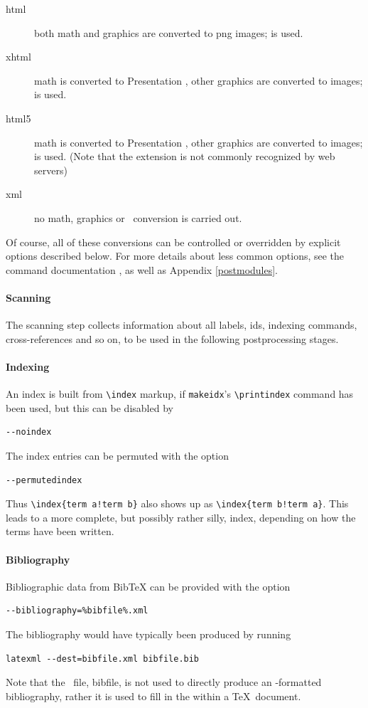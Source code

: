 \documentclass{book}
\newcommand{\shellcode}{\lstinline[style=shell]}
\begin{document}
\begin{description}
 \item[html] both math and graphics are converted to png images;
     is used.
 \item[xhtml] math is converted to Presentation \MathML, other graphics are converted to images;
       is used.
 \item[html5] math is converted to Presentation \MathML, other graphics are converted to images;
      is used.
    (Note that the extension  is not commonly recognized by web servers)
 \item[xml] no math, graphics or \XSLT\ conversion is carried out.
\end{description}
Of course, all of these conversions can be controlled or overridden
by explicit options described below.
For more details about less common options, see the command
documentation , as well as Appendix \ref{postmodules}.

\paragraph{Scanning}
The scanning step collects information about all labels, ids,
indexing commands, cross-references and so on, to be used
in the following postprocessing stages.

\paragraph{Indexing}
An index is built from \verb|\index| markup, if
\shellcode{makeidx}'s \verb|\printindex| command has been used,
but this can be disabled by
\begin{lstlisting}[style=shell]
--noindex
\end{lstlisting}
The index entries can be permuted with the option
\begin{lstlisting}[style=shell]
--permutedindex
\end{lstlisting}
Thus \verb|\index{term a!term b}| also shows up as \verb|\index{term b!term a}|.
This leads to a more complete, but possibly rather silly, index,
depending on how the terms have been written.

\paragraph{Bibliography}
Bibliographic data from BibTeX can be provided with the option
\begin{lstlisting}[style=shell]
--bibliography=%bibfile%.xml
\end{lstlisting}
The bibliography would have typically been produced by running
\begin{lstlisting}[style=shell]
latexml --dest=bibfile.xml bibfile.bib
\end{lstlisting}
Note that the \XML\ file, bibfile, is not used to directly produce
an \HTML-formatted bibliography, rather it is used to fill in
the \verb|| within a \TeX\ document.
\end{document}
